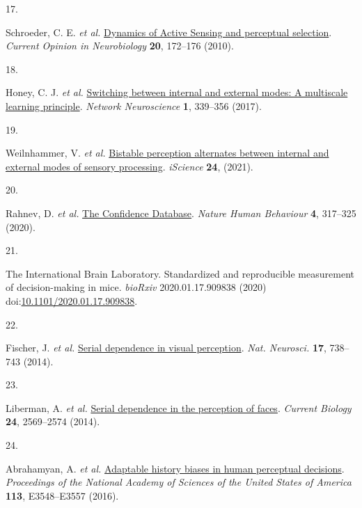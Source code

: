 \documentclass[
]{article}
\newlength{\cslhangindent}
\newlength{\csllabelwidth}
\newlength{\cslentryspacingunit} %
\newenvironment{CSLReferences}[2] %
 {%
  \setlength{\parindent}{0pt}
  \ifodd #1
  \let\oldpar\par
  \def\par{\hangindent=\cslhangindent\oldpar}
  \fi
  \setlength{\parskip}{#2\cslentryspacingunit}
 }%
 {}
\newcommand{\CSLLeftMargin}[1]{\parbox[t]{\csllabelwidth}{#1}}
\newcommand{\CSLRightInline}[1]{\parbox[t]{\linewidth - \csllabelwidth}{#1}\break}
\begin{document}
\begin{CSLReferences}{0}{0}
\leavevmode{}%
\CSLLeftMargin{17. }%
\CSLRightInline{Schroeder, C. E. \emph{et al.}
\href{https://doi.org/10.1016/j.conb.2010.02.010}{{Dynamics of Active
Sensing and perceptual selection}}. \emph{Current Opinion in
Neurobiology} \textbf{20}, 172--176 (2010).}

\leavevmode{}%
\CSLLeftMargin{18. }%
\CSLRightInline{Honey, C. J. \emph{et al.}
\href{https://doi.org/10.1162/netn_a_00024}{{Switching between internal
and external modes: A multiscale learning principle}}. \emph{Network
Neuroscience} \textbf{1}, 339--356 (2017).}

\leavevmode{}%
\CSLLeftMargin{19. }%
\CSLRightInline{Weilnhammer, V. \emph{et al.}
\href{https://doi.org/10.1016/j.isci.2021.102234}{{Bistable perception
alternates between internal and external modes of sensory processing}}.
\emph{iScience} \textbf{24}, (2021).}

\leavevmode{}%
\CSLLeftMargin{20. }%
\CSLRightInline{Rahnev, D. \emph{et al.}
\href{https://doi.org/10.1038/s41562-019-0813-1}{{The Confidence
Database}}. \emph{Nature Human Behaviour} \textbf{4}, 317--325 (2020).}

\leavevmode{}%
\CSLLeftMargin{21. }%
\CSLRightInline{The International Brain Laboratory. {Standardized and
reproducible measurement of decision-making in mice}. \emph{bioRxiv}
2020.01.17.909838 (2020)
doi:\href{https://doi.org/10.1101/2020.01.17.909838}{10.1101/2020.01.17.909838}.}

\leavevmode{}%
\CSLLeftMargin{22. }%
\CSLRightInline{Fischer, J. \emph{et al.}
\href{https://doi.org/10.1038/nn.3689}{{Serial dependence in visual
perception}}. \emph{Nat. Neurosci.} \textbf{17}, 738--743 (2014).}

\leavevmode{}%
\CSLLeftMargin{23. }%
\CSLRightInline{Liberman, A. \emph{et al.}
\href{https://doi.org/10.1016/j.cub.2014.09.025}{{Serial dependence in
the perception of faces}}. \emph{Current Biology} \textbf{24},
2569--2574 (2014).}

\leavevmode{}%
\CSLLeftMargin{24. }%
\CSLRightInline{Abrahamyan, A. \emph{et al.}
\href{https://doi.org/10.1073/pnas.1518786113}{{Adaptable history biases
in human perceptual decisions}}. \emph{Proceedings of the National
Academy of Sciences of the United States of America} \textbf{113},
E3548--E3557 (2016).}


\end{CSLReferences}
\end{document}
